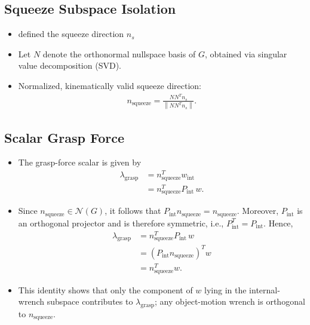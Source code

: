 \documentclass[conference]{IEEEtran}
\begin{document}
\subsection{Squeeze Subspace Isolation}

\begin{itemize}
    \item defined the squeeze direction $n_s$ 

    \item Let \(N\) denote the orthonormal nullspace basis of \(G\), obtained via singular value decomposition (SVD).

    \item Normalized, kinematically valid squeeze direction:
    \begin{align}
        n_{\mathrm{squeeze}}
        =
        \frac{N N^{T} n_s}
        {\left\lVert N N^{T} n_s \right\rVert}.
    \end{align}
\end{itemize}

\subsection{Scalar Grasp Force}
\begin{itemize}
    \item The grasp-force scalar is given by
    \begin{align}
        \lambda_{\mathrm{grasp}}
        &= n_{\mathrm{squeeze}}^{T} w_{\mathrm{int}} \\
        &= n_{\mathrm{squeeze}}^{T} P_{\mathrm{int}}\, w.
    \end{align}

    \item Since \(n_{\mathrm{squeeze}} \in \mathcal{N}(G)\), it follows that
    \(P_{\mathrm{int}} n_{\mathrm{squeeze}} = n_{\mathrm{squeeze}}\). Moreover,
    \(P_{\mathrm{int}}\) is an orthogonal projector and is therefore symmetric,
    i.e., \(P_{\mathrm{int}}^{T} = P_{\mathrm{int}}\). Hence,
    \begin{align}
        \lambda_{\mathrm{grasp}}
        &= n_{\mathrm{squeeze}}^{T} P_{\mathrm{int}}\, w \\
        &= \left(P_{\mathrm{int}} n_{\mathrm{squeeze}}\right)^{T} w \\
        &= n_{\mathrm{squeeze}}^{T} w.
    \end{align}

    \item This identity shows that only the component of \(w\) lying in the
    internal-wrench subspace contributes to \(\lambda_{\mathrm{grasp}}\); any
    object-motion wrench is orthogonal to \(n_{\mathrm{squeeze}}\).
\end{itemize}
\end{document}
